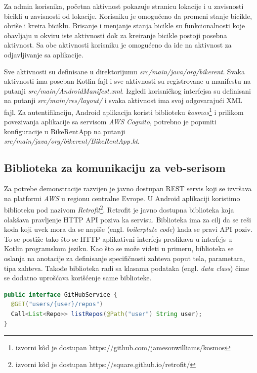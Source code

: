 \documentclass[12pt,oneside]{memoir}
\begin{document}
Za admin korisnika, početna aktivnost pokazuje stranicu lokacije i u zavisnosti bicikli u zavisnosti od lokacije. Korisniku je omogućeno da promeni stanje bicikle, obriše i kreira biciklu. Brisanje i menjanje stanja bicikle su funkcionalnosti koje obavljaju u okviru iste aktivnosti dok za kreiranje bicikle postoji posebna aktivnost. Sa obe aktivnosti korisniku je omogućeno da ide na aktivnost za odjavljivanje sa aplikacije.

Sve aktivnosti su definisane u direktorijumu \emph{src/main/java/org/bikerent}. Svaka aktivnosti ima poseban Kotlin fajl i sve aktivnosti su registrovane u manifestu na putanji \emph{src/main/AndroidManifest.xml}. Izgledi korisničkog interfejsa su definisani na putanji \emph{src/main/res/layout/} i svaka aktivnost ima svoj odgovarajući XML fajl. Za autentifikaciju, Android aplikacija koristi biblioteku \emph{kosmos}\footnote{izvorni kôd je dostupan https://github.com/jamesonwilliams/kosmos} i prilikom povezivanja aplikacije sa servisom \emph{AWS Cognito}, potrebno je popuniti konfiguracije u BikeRentApp na putanji \emph{src/main/java/org/bikerent/BikeRentApp.kt}.


\subsection{Biblioteka za komunikaciju za veb-serisom}
 
Za potrebe demonstracije razvijen je javno dostupan REST servis koji se izvršava na platformi \emph{AWS} u regionu centralne Evrope. U Android aplikaciji koristimo biblioteku pod nazivom \emph{Retrofit}\footnote{izvorni kôd je dostupan https://square.github.io/retrofit/}. Retrofit je javno dostupna biblioteka koja olakšava pravljenje HTTP API poziva ka servisu. Biblioteka ima za cilj da se reši koda koji uvek mora da se napiše (engl. \emph{boilerplate code}) kada se pravi API poziv. To se postiže tako što se HTTP aplikativni interfejs preslikava u interfejs u Kotlin programskom jeziku. Kao što se može videti u primeru, biblioteka se oslanja na anotacije za definisanje specifičnosti zahteva poput tela, parametara, tipa zahteva. Takođe biblioteka radi sa klasama podataka (engl. \emph{data class}) čime se dodatno uprošćava korišćenje same biblioteke.

\begin{lstlisting}[caption={Interfejs za izvršavanje GET API poziva},captionpos=t, language=Java]
public interface GitHubService {
  @GET("users/{user}/repos")
  Call<List<Repo>> listRepos(@Path("user") String user);
}
\end{lstlisting}
\end{document}
